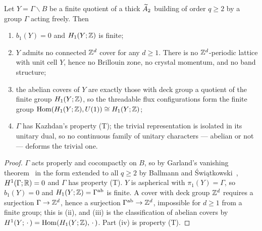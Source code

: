 \begin{theorem}\label{Phys1:thm:nogo}
Let $Y=\Gamma\backslash B$ be a finite quotient of a thick $\widetilde A_2$ building of order
$q\ge2$ by a group $\Gamma$ acting freely. Then
\begin{enumerate}
\item[(i)] $b_1(Y)=0$ and $H_1(Y;\mathbb{Z})$ is finite;
\item[(ii)] $Y$ admits no connected $\mathbb{Z}^{d}$ cover for any $d\ge1$. There is no
$\mathbb{Z}^{d}$-periodic lattice with unit cell $Y$, hence no Brillouin zone, no crystal momentum,
and no band structure;
\item[(iii)] the abelian covers of $Y$ are exactly those with deck group a quotient of the
finite group $H_1(Y;\mathbb{Z})$, so the threadable flux configurations form the finite group
$\operatorname{Hom}(H_1(Y;\mathbb{Z}),U(1))\cong H_1(Y;\mathbb{Z})$;
\item[(iv)] $\Gamma$ has Kazhdan's property (T); the trivial representation is isolated in
its unitary dual, so no continuous family of unitary characters --- abelian or not ---
deforms the trivial one.
\end{enumerate}
\end{theorem}

\begin{proof}
$\Gamma$ acts properly and cocompactly on $B$, so by Garland's vanishing
theorem~\cite{Ga} in the form extended to all $q\ge2$ by Ballmann and
\'Swi\k{a}tkowski~\cite{BSw}, $H^{1}(\Gamma;\mathbb{R})=0$ and $\Gamma$ has property (T). $Y$ is
aspherical with $\pi_1(Y)=\Gamma$, so $b_1(Y)=0$ and $H_1(Y;\mathbb{Z})=\Gamma^{\mathrm{ab}}$ is
finite. A cover with deck group $\mathbb{Z}^{d}$ requires a surjection $\Gamma\to\mathbb{Z}^{d}$, hence a
surjection $\Gamma^{\mathrm{ab}}\to\mathbb{Z}^{d}$, impossible for $d\ge1$ from a finite group; this
is (ii), and (iii) is the classification of abelian covers by
$H^{1}(Y;\,\cdot\,)=\operatorname{Hom}(H_1(Y;\mathbb{Z}),\,\cdot\,)$. Part (iv) is property (T).
\end{proof}

